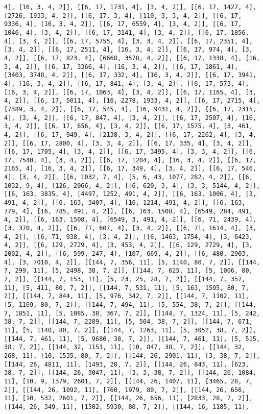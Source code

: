 \documentclass[12pt,fleqn]{article}\usepackage{../../common}
\begin{document}
\begin{verbatim}
4], [16, 3, 4, 2]], [[6, 17, 1731, 4], [3, 4, 2]], [[6, 17, 1427, 4], [2726, 1933, 4, 2]], [[6, 17, 3, 4], [110, 3, 3, 4, 2]], [[6, 17, 9336, 4], [16, 3, 4, 2]], [[6, 17, 6559, 4], [3, 4, 2]], [[6, 17, 1046, 4], [3, 4, 2]], [[6, 17, 3141, 4], [3, 4, 2]], [[6, 17, 1856, 4], [3, 4, 2]], [[6, 17, 5755, 4], [3, 3, 4, 2]], [[6, 17, 2351, 4], [3, 4, 2]], [[6, 17, 2511, 4], [16, 3, 4, 2]], [[6, 17, 974, 4], [3, 4, 2]], [[6, 17, 823, 4], [6668, 3578, 4, 2]], [[6, 17, 1338, 4], [16, 3, 4, 2]], [[6, 17, 3366, 4], [16, 3, 4, 2]], [[6, 17, 1861, 4], [3403, 3748, 4, 2]], [[6, 17, 332, 4], [16, 3, 4, 2]], [[6, 17, 3941, 4], [16, 3, 4, 2]], [[6, 17, 841, 4], [3, 4, 2]], [[6, 17, 573, 4], [16, 3, 4, 2]], [[6, 17, 1063, 4], [3, 4, 2]], [[6, 17, 1165, 4], [3, 4, 2]], [[6, 17, 5011, 4], [16, 2278, 1933, 4, 2]], [[6, 17, 2715, 4], [7389, 3, 4, 2]], [[6, 17, 545, 4], [16, 9431, 4, 2]], [[6, 17, 2315, 4], [3, 4, 2]], [[6, 17, 847, 4], [3, 4, 2]], [[6, 17, 2507, 4], [16, 3, 4, 2]], [[6, 17, 656, 4], [3, 4, 2]], [[6, 17, 1575, 4], [3, 461, 4, 2]], [[6, 17, 949, 4], [2138, 3, 4, 2]], [[6, 17, 2262, 4], [3, 4, 2]], [[6, 17, 2800, 4], [3, 3, 4, 2]], [[6, 17, 335, 4], [3, 4, 2]], [[6, 17, 1705, 4], [3, 4, 2]], [[6, 17, 3495, 4], [3, 3, 4, 2]], [[6, 17, 7540, 4], [3, 4, 2]], [[6, 17, 1204, 4], [16, 3, 4, 2]], [[6, 17, 2165, 4], [16, 3, 4, 2]], [[6, 17, 349, 4], [3, 4, 2]], [[6, 17, 546, 4], [3, 4, 2]], [[6, 1032, 7, 4], [5, 6, 43, 1077, 282, 4, 2]], [[6, 1032, 9, 4], [126, 2066, 4, 2]], [[6, 620, 3, 4], [3, 3, 5144, 4, 2]], [[6, 163, 3835, 4], [4497, 1252, 491, 4, 2]], [[6, 163, 1006, 4], [3, 491, 4, 2]], [[6, 163, 3407, 4], [16, 1214, 491, 4, 2]], [[6, 163, 779, 4], [16, 785, 491, 4, 2]], [[6, 163, 1508, 4], [6549, 284, 491, 4, 2]], [[6, 163, 1508, 4], [6549, 3, 491, 4, 2]], [[6, 71, 2439, 4], [3, 370, 4, 2]], [[6, 71, 607, 4], [3, 4, 2]], [[6, 71, 1614, 4], [3, 4, 2]], [[6, 71, 938, 4], [3, 4, 2]], [[6, 1463, 1754, 4], [3, 6423, 4, 2]], [[6, 129, 2729, 4], [3, 453, 4, 2]], [[6, 129, 2729, 4], [3, 2002, 4, 2]], [[6, 599, 247, 4], [107, 669, 4, 2]], [[6, 480, 2903, 4], [3, 7010, 4, 2]], [[144, 7, 356, 11], [5, 1140, 80, 7, 2]], [[144, 7, 299, 11], [5, 2498, 38, 7, 2]], [[144, 7, 625, 11], [5, 1006, 80, 7, 2]], [[144, 7, 153, 11], [5, 23, 25, 28, 7, 2]], [[144, 7, 357, 11], [5, 411, 80, 7, 2]], [[144, 7, 531, 11], [5, 163, 1595, 80, 7, 2]], [[144, 7, 844, 11], [5, 976, 342, 7, 2]], [[144, 7, 1102, 11], [5, 1169, 80, 7, 2]], [[144, 7, 494, 11], [5, 554, 38, 7, 2]], [[144, 7, 1851, 11], [5, 1085, 38, 367, 7, 2]], [[144, 7, 1324, 11], [5, 242, 38, 7, 2]], [[144, 7, 2289, 11], [5, 504, 38, 7, 2]], [[144, 7, 671, 11], [5, 1140, 80, 7, 2]], [[144, 7, 1263, 11], [5, 3052, 38, 7, 2]], [[144, 7, 461, 11], [5, 9680, 38, 7, 2]], [[144, 7, 461, 11], [5, 515, 38, 7, 2]], [[144, 32, 1151, 11], [10, 847, 38, 7, 2]], [[144, 32, 268, 11], [10, 1535, 80, 7, 2]], [[144, 26, 2901, 11], [3, 38, 7, 2]], [[144, 26, 4811, 11], [1493, 28, 7, 2]], [[144, 26, 843, 11], [623, 38, 7, 2]], [[144, 26, 3047, 11], [3, 3, 38, 7, 2]], [[144, 26, 1084, 11], [10, 9, 1379, 2601, 7, 2]], [[144, 26, 1407, 11], [3465, 28, 7, 2]], [[144, 26, 1092, 11], [760, 1979, 80, 7, 2]], [[144, 26, 656, 11], [10, 532, 2601, 7, 2]], [[144, 26, 656, 11], [2833, 28, 7, 2]], [[144, 26, 349, 11], [1502, 5930, 80, 7, 2]], [[144, 16, 1185, 11], 
\end{verbatim}
\end{document}
